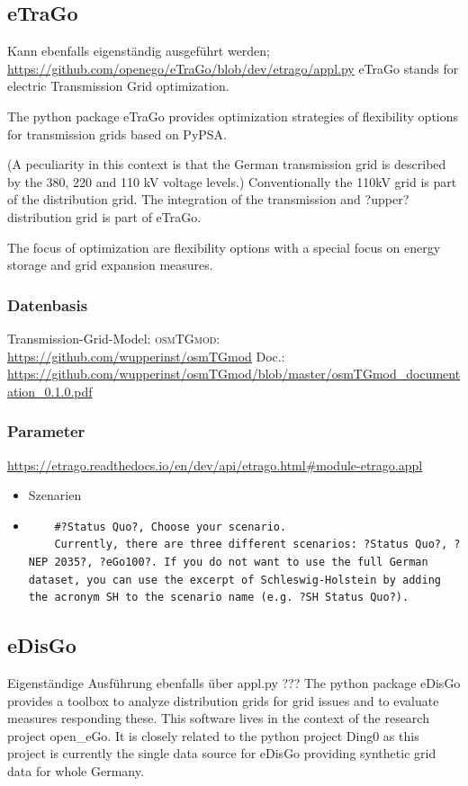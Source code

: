 \documentclass[
a4paper,     %
12pt         %
]{scrartcl}  %
\begin{document}
\subsection{eTraGo}
Kann ebenfalls eigenständig ausgeführt werden;
\url{https://github.com/openego/eTraGo/blob/dev/etrago/appl.py}
eTraGo stands for electric Transmission Grid optimization.

The python package eTraGo provides optimization strategies of flexibility options for transmission grids based on PyPSA.

(A peculiarity in this context is that the German transmission grid is described by the 380, 220 and 110 kV voltage levels.)
Conventionally the 110kV grid is part of the distribution grid. The integration of the transmission and ?upper? distribution grid is part of eTraGo.

The focus of optimization are flexibility options with a special focus on energy storage and grid expansion measures.
\subsubsection{Datenbasis}
Transmission-Grid-Model: \textsc{osmTGmod}:
\url{https://github.com/wupperinst/osmTGmod}
Doc.: \url{https://github.com/wupperinst/osmTGmod/blob/master/osmTGmod_documentation_0.1.0.pdf}

\subsubsection{Parameter}
\url{https://etrago.readthedocs.io/en/dev/api/etrago.html#module-etrago.appl}
\begin{itemize}
	\item Szenarien
	\item[] \begin{lstlisting}
	#?Status Quo?, Choose your scenario.
	Currently, there are three different scenarios: ?Status Quo?, ?NEP 2035?, ?eGo100?. If you do not want to use the full German dataset, you can use the excerpt of Schleswig-Holstein by adding the acronym SH to the scenario name (e.g. ?SH Status Quo?).
	\end{lstlisting}
\end{itemize}

\subsection{eDisGo}
Eigenständige Ausführung ebenfalls über appl.py ???
The python package eDisGo provides a toolbox to analyze distribution grids for grid issues and to evaluate measures responding these. This software lives in the context of the research project open\_eGo. It is closely related to the python project Ding0 as this project is currently the single data source for eDisGo providing synthetic grid data for whole Germany.
\end{document}
